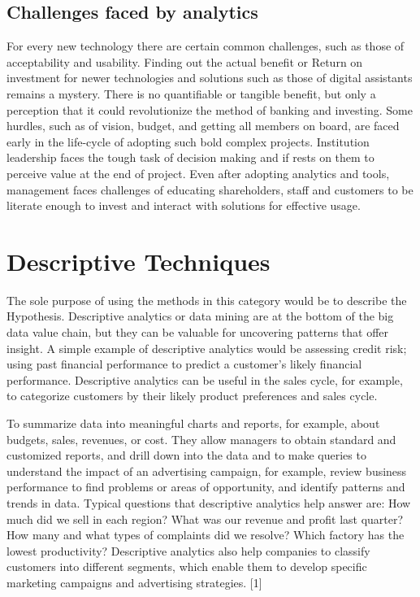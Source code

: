 \newpage
\section{Challenges faced by analytics}
For every new technology there are certain common challenges, such as those of acceptability and usability. Finding out the actual benefit or Return on investment for newer technologies and solutions such as those of digital assistants remains a mystery. There is no quantifiable or tangible benefit, but only a perception that it could revolutionize the method of banking and investing.
Some hurdles, such as of vision, budget, and getting all members on board, are faced early in the life-cycle of adopting such bold complex projects. Institution leadership faces the tough task of decision making and if rests on them to perceive value at the end of project.
Even after adopting analytics and tools, management faces challenges of educating shareholders, staff and customers to be literate enough to invest and interact with solutions for effective usage.




\chapter{Descriptive Techniques} 
\label{ch:literature-review}

The sole purpose of using the methods in this category would be to describe the Hypothesis. Descriptive analytics or data mining are at the bottom of the big data value chain, but they can be valuable for uncovering patterns that offer insight. A simple example of descriptive analytics would be assessing credit risk; using past financial performance to predict a customer’s likely financial performance. Descriptive analytics can be useful in the sales cycle, for example, to categorize customers by their likely product preferences and sales cycle.

To summarize data into meaningful charts and reports, for example, about budgets, sales, revenues, or cost. They allow managers to obtain standard and customized reports, and drill down into the data and to make queries to understand the impact of an advertising campaign, for example, review business performance to find problems or areas of opportunity, and identify patterns and trends in data. Typical questions that descriptive analytics help answer are: How much did we sell in each region? What was our revenue and profit last quarter? How many and what types of complaints did we resolve? Which factory has the lowest productivity? Descriptive analytics also help companies to classify customers into different segments, which enable them to develop specific marketing campaigns and advertising strategies. [1]

